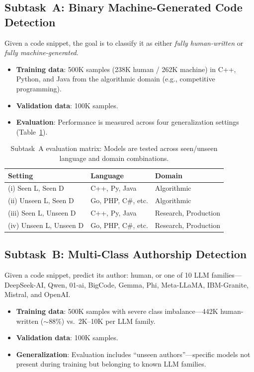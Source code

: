 \documentclass[11pt]{article}
\begin{document}
\subsection{Subtask~A: Binary Machine-Generated Code Detection}

Given a code snippet, the goal is to classify it as either \textit{fully human-written} or \textit{fully machine-generated}.

\begin{itemize}
    \item \textbf{Training data}: 500K samples (238K human / 262K machine) in C++, Python, and Java from the algorithmic domain (e.g., competitive programming).
    \item \textbf{Validation data}: 100K samples.
    \item \textbf{Evaluation}: Performance is measured across four generalization settings (Table~\ref{tab:taskA_eval}).
\end{itemize}

\begin{table}[ht]
\centering
\small
\begin{tabularx}{\columnwidth}{@{}l l X@{}}
\toprule
\textbf{Setting} & \textbf{Language} & \textbf{Domain} \\ \midrule
(i) Seen L, Seen D & C++, Py, Java & Algorithmic \\
(ii) Unseen L, Seen D & Go, PHP, C\#, etc. & Algorithmic \\
(iii) Seen L, Unseen D & C++, Py, Java & Research, Production \\
(iv) Unseen L, Unseen D & Go, PHP, C\#, etc. & Research, Production \\ \bottomrule
\end{tabularx}
\caption{Subtask~A evaluation matrix: Models are tested across seen/unseen language and domain combinations.}
\label{tab:taskA_eval}
\end{table}


\subsection{Subtask~B: Multi-Class Authorship Detection}

Given a code snippet, predict its author: human, or one of 10 LLM families---DeepSeek-AI, Qwen, 01-ai, BigCode, Gemma, Phi, Meta-LLaMA, IBM-Granite, Mistral, and OpenAI.

\begin{itemize}
    \item \textbf{Training data}: 500K samples with severe class imbalance---442K human-written ($\sim$88\%) vs.\ 2K--10K per LLM family.
    \item \textbf{Validation data}: 100K samples.
    \item \textbf{Generalization}: Evaluation includes ``unseen authors''---specific models not present during training but belonging to known LLM families.
\end{itemize}
\end{document}

